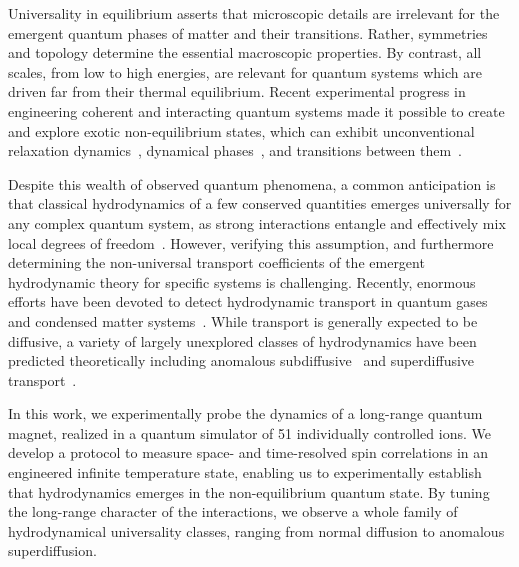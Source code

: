 \documentclass[aps,10pt,reprint,groupedaddress,superscriptaddress]{revtex4-2}
\begin{document}

Universality in equilibrium asserts that microscopic details are irrelevant for the emergent quantum phases of matter and their transitions. Rather, symmetries and topology determine the essential macroscopic properties. By contrast, all scales, from low to high energies, are relevant for quantum systems which are driven far from their thermal equilibrium. Recent experimental progress in engineering coherent and interacting quantum systems made it possible to create and explore exotic non-equilibrium states, which can exhibit unconventional relaxation dynamics~\cite{gring_relaxation_2012, Bohnet:2016, Tang_2018, bernien_probing_2017, guardado-sanchez_2020, scherg_2020}, dynamical phases~\cite{schreiber_observation_2015, Smith_2016, kaufman_quantum_2016, Brydges_2019, prufer_observation_2018, erne_universal_2018}, and transitions between them~\cite{PhysRevLett.119.080501, monroeDQPT}. 

Despite this wealth of observed quantum phenomena, a common anticipation is that classical hydrodynamics of a few conserved quantities emerges universally for any complex quantum system, as strong interactions entangle and effectively mix local degrees of freedom~\cite{lux_hydrodynamic_2014, Bohrdt_2017}. However, verifying this assumption, and furthermore determining the non-universal transport coefficients of the emergent hydrodynamic theory for specific systems is challenging. 
Recently, enormous efforts have been devoted to detect hydrodynamic transport in quantum gases~\cite{cao_universal_2011, sommer_universal_2011, schneider_fermionic_2012, brown_bad_2019} and condensed matter systems~\cite{Bandurin_2016, Crossno_2016, Moll_2016, zu_2021}. While transport is generally expected to be diffusive, a variety of largely unexplored classes of hydrodynamics have been  predicted theoretically including anomalous subdiffusive~\cite{Gromov_2020, feldmeier_2020a} and superdiffusive transport~\cite{Ljubotina_2017,bulchandani_2021, PhysRevB.101.020416}. 

In this work, we experimentally probe the dynamics of a long-range quantum magnet, realized in a quantum simulator of 51 individually controlled ions. We develop a protocol to measure space- and time-resolved spin correlations in an engineered infinite temperature state, enabling us to experimentally establish that hydrodynamics emerges in the non-equilibrium quantum state. By tuning the long-range character of the interactions, we observe a whole family of hydrodynamical universality classes, ranging from normal diffusion to anomalous superdiffusion. 
\end{document}
